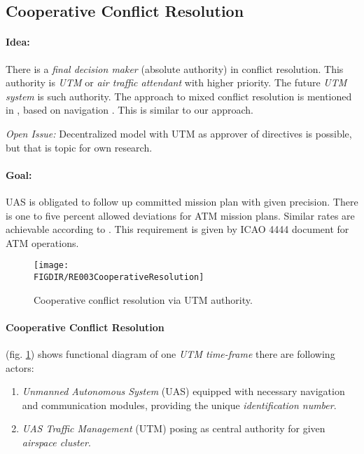 \subsection{Cooperative Conflict Resolution}\label{sec:cooperativeConflictResolution}


\paragraph{Idea:} There is a \emph{final decision maker} (absolute authority) in conflict resolution. This authority is \emph{UTM} or \emph{air traffic attendant} with higher priority. The future \emph{UTM system} is such authority. The approach to mixed conflict resolution is mentioned in \cite{ramasamy2014towards}, based on navigation \cite{ramasamy2013novel}. This is similar to our approach. 

\begin{note}
    \emph{Open Issue:} Decentralized model with UTM as approver of directives is possible, but that is topic for own research.
\end{note}

\paragraph{Goal:} UAS is obligated to follow up committed mission plan with given precision.  There is one to five percent  allowed deviations for ATM mission plans.     Similar rates are achievable according to \cite{ramasamy2014towards}.  This requirement is given by \cite{icao4444} ICAO 4444 document for ATM operations.

\begin{figure}[H]
    \centering
    \texttt{[image: \\FIGDIR/RE003CooperativeResolution]} 
    \caption{Cooperative conflict resolution via UTM authority.}
    \label{fig:CooperativeConflictResolutionUTM}
\end{figure}

\paragraph{Cooperative Conflict Resolution} (fig. \ref{fig:CooperativeConflictResolutionUTM}) shows functional diagram of one \emph{UTM time-frame} there  are following actors:
\begin{enumerate}
    \item \emph{Unmanned Autonomous System} (UAS) equipped with necessary navigation and communication modules, providing the unique \emph{identification number}.
    
    \item \emph{UAS Traffic Management} (UTM) posing as central authority for given \emph{airspace cluster}.
\end{enumerate}

